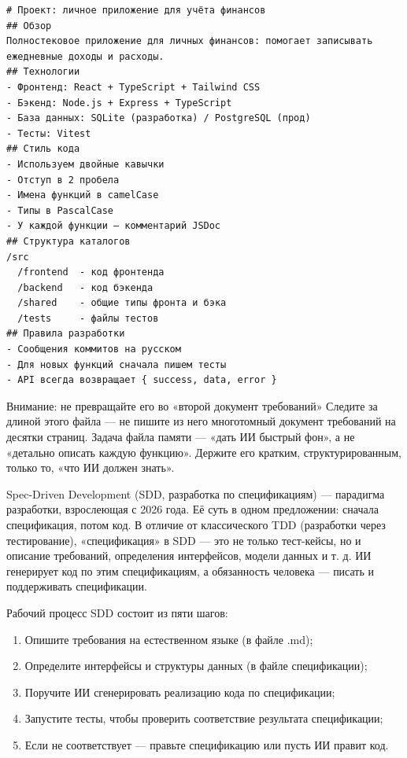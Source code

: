\begin{lstlisting}
# Проект: личное приложение для учёта финансов
## Обзор
Полностековое приложение для личных финансов: помогает записывать ежедневные доходы и расходы.
## Технологии
- Фронтенд: React + TypeScript + Tailwind CSS
- Бэкенд: Node.js + Express + TypeScript
- База данных: SQLite (разработка) / PostgreSQL (прод)
- Тесты: Vitest
## Стиль кода
- Используем двойные кавычки
- Отступ в 2 пробела
- Имена функций в camelCase
- Типы в PascalCase
- У каждой функции — комментарий JSDoc
## Структура каталогов
/src
  /frontend  - код фронтенда
  /backend   - код бэкенда
  /shared    - общие типы фронта и бэка
  /tests     - файлы тестов
## Правила разработки
- Сообщения коммитов на русском
- Для новых функций сначала пишем тесты
- API всегда возвращает { success, data, error }
\end{lstlisting}

\begin{tcbwarn}{Внимание: не превращайте его во «второй документ требований»}
Следите за длиной этого файла — не пишите из него многотомный документ требований на десятки страниц. Задача файла памяти — «дать ИИ быстрый фон», а не «детально описать каждую функцию». Держите его кратким, структурированным, только то, «что ИИ должен знать».

\end{tcbwarn}


Spec-Driven Development (SDD, разработка по спецификациям) — парадигма разработки, взрослеющая с 2026 года. Её суть в одном предложении: сначала спецификация, потом код. В отличие от классического TDD (разработки через тестирование), «спецификация» в SDD — это не только тест-кейсы, но и описание требований, определения интерфейсов, модели данных и т. д. ИИ генерирует код по этим спецификациям, а обязанность человека — писать и поддерживать спецификации.

Рабочий процесс SDD состоит из пяти шагов:

\begin{enumerate}
  \item Опишите требования на естественном языке (в файле .md);
  \item Определите интерфейсы и структуры данных (в файле спецификации);
  \item Поручите ИИ сгенерировать реализацию кода по спецификации;
  \item Запустите тесты, чтобы проверить соответствие результата спецификации;
  \item Если не соответствует — правьте спецификацию или пусть ИИ правит код.
\end{enumerate}

